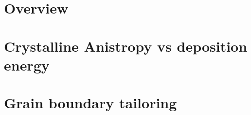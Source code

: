 \section{Overview}
\section{Crystalline Anistropy vs deposition energy}
\section{Grain boundary tailoring}

